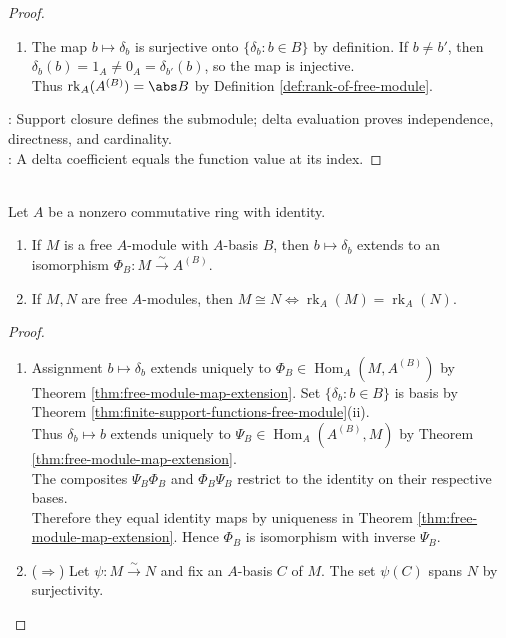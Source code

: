 \begin{theorem}
\begin{proof}
\begin{enumerate}[label=(\roman*)]
\item The map $b\mapsto\delta_b$ is surjective onto $\{\delta_b:b\in B\}$ by definition. If $b\neq b'$, then $\delta_b(b)=1_A\neq0_A=\delta_{b'}(b)$, so the map is injective.\\
Thus $\operatorname{rk}_A(A^{(B)})=\abs B$ by Definition \ref{def:rank-of-free-module}.
\end{enumerate}
: Support closure defines the submodule; delta evaluation proves independence, directness, and cardinality.\\
: A delta coefficient equals the function value at its index.
\end{proof}
\end{theorem}

\begin{proposition} \label{prop:free-module-coordinate-model-and-isomorphism} \\
Let $A$ be a nonzero commutative ring with identity.
\begin{enumerate}[label=(\roman*)]
\setlength{\itemsep}{0pt}
\item If $M$ is a free $A$-module with $A$-basis $B$, then $b\mapsto\delta_b$ extends to an isomorphism $\Phi_B:M\xrightarrow{\sim}A^{(B)}$.
\item If $M,N$ are free $A$-modules, then $M\cong N\Longleftrightarrow\operatorname{rk}_A(M)=\operatorname{rk}_A(N)$.
\end{enumerate}
\begin{proof}
\begin{enumerate}[label=(\roman*)]
\setlength{\itemsep}{0pt}
\item[$(i)$] Assignment $b\mapsto\delta_b$ extends uniquely to $\Phi_B\in\operatorname{Hom}_A(M,A^{(B)})$ by Theorem \ref{thm:free-module-map-extension}. Set $\{\delta_b:b\in B\}$ is basis by Theorem \ref{thm:finite-support-functions-free-module}(ii).\\
Thus $\delta_b\mapsto b$ extends uniquely to $\Psi_B\in\operatorname{Hom}_A(A^{(B)},M)$ by Theorem \ref{thm:free-module-map-extension}.\\
The composites $\Psi_B\Phi_B$ and $\Phi_B\Psi_B$ restrict to the identity on their respective bases.\\
Therefore they equal identity maps by uniqueness in Theorem \ref{thm:free-module-map-extension}. Hence $\Phi_B$ is isomorphism with inverse $\Psi_B$.
\item[$(ii)$] ($\Rightarrow$) Let $\psi:M\xrightarrow{\sim}N$ and fix an $A$-basis $C$ of $M$. The set $\psi(C)$ spans $N$ by surjectivity.\\

\end{enumerate}
\end{proof}
\end{proposition}
